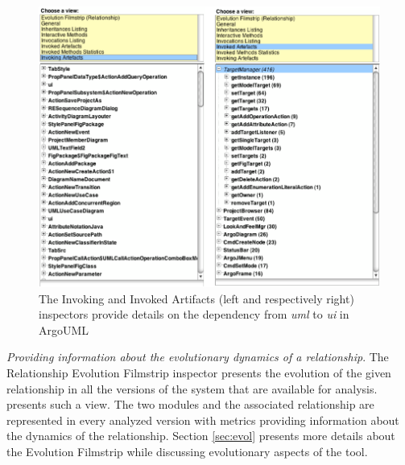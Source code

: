 \documentclass[preprint,12pt]{elsarticle}
\newcommand{\cd}[1]{{\em{#1}}}
\begin{document}
\begin{description}
\begin{figure}[h]
\begin{center}
\includegraphics[width=\linewidth]{DetailsForEdge}
\caption{The Invoking and Invoked Artifacts (left and respectively right) inspectors provide details on the dependency from \cd{uml} to \cd{ui} in ArgoUML} 
\end{center}
\end{figure}



\item {\em Providing information about the evolutionary dynamics of a relationship}. The Relationship Evolution Filmstrip inspector presents the evolution of the given relationship in all the versions of the system that are available for analysis.  presents such a view. The two modules and the associated relationship are represented in every analyzed version with metrics providing information about the dynamics of the relationship. Section \ref{sec:evol} presents more details about the Evolution Filmstrip while discussing evolutionary aspects of the tool.

\end{description}




\end{document}
